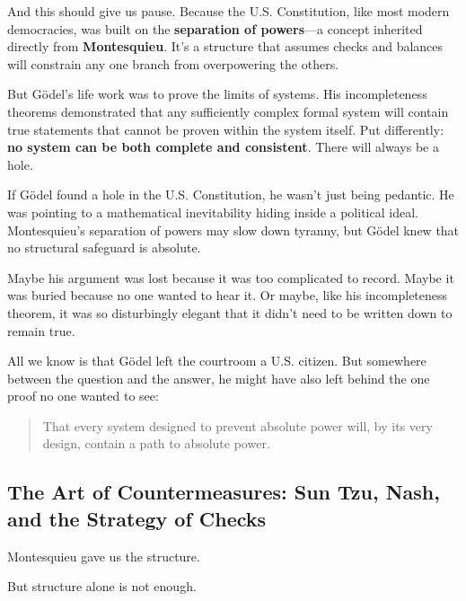 \begin{tcolorbox}[title=Historical Sidebar: Gödel’s Missing Proof — The Constitutional Loophole That Was Never Written Down, colback=gray!5!white, colframe=black!80!white, breakable, fonttitle=\bfseries]
  \medskip
  
  And this should give us pause. Because the U.S. Constitution, like most modern democracies, was built on the \textbf{separation of powers}—a concept inherited directly from \textbf{Montesquieu}. It’s a structure that assumes checks and balances will constrain any one branch from overpowering the others.  

  \medskip
  
  But Gödel’s life work was to prove the limits of systems. His incompleteness theorems demonstrated that any sufficiently complex formal system will contain true statements that cannot be proven within the system itself. Put differently: \textbf{no system can be both complete and consistent}. There will always be a hole.  

  \medskip
  
  If Gödel found a hole in the U.S. Constitution, he wasn’t just being pedantic. He was pointing to a mathematical inevitability hiding inside a political ideal. Montesquieu’s separation of powers may slow down tyranny, but Gödel knew that no structural safeguard is absolute.  

  \medskip
  
  Maybe his argument was lost because it was too complicated to record. Maybe it was buried because no one wanted to hear it. Or maybe, like his incompleteness theorem, it was so disturbingly elegant that it didn’t need to be written down to remain true.  

  \medskip
  
  All we know is that Gödel left the courtroom a U.S. citizen. But somewhere between the question and the answer, he might have also left behind the one proof no one wanted to see:  

  \begin{quote}
  That every system designed to prevent absolute power will, by its very design, contain a path to absolute power.
  \end{quote}
  
\end{tcolorbox}


\subsection{The Art of Countermeasures: Sun Tzu, Nash, and the Strategy of Checks}

Montesquieu gave us the structure.

But structure alone is not enough.

